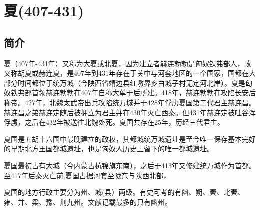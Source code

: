 

\section{夏\tiny(407-431)}

\subsection{简介}

夏（407年-431年）又称为大夏或北夏，因为建立者赫连勃勃是匈奴铁弗部人，故又称胡夏或赫连夏，是407年到431年存在于关中与河套地区的一个国家，国都在大部分时间都位于统万城（今陕西省靖边县红墩界乡白城子村无定河北岸）。夏是匈奴铁弗部首领赫连勃勃在407年自称大单于后所建。418年，赫连勃勃在攻陷长安后称帝。427年，北魏太武帝出兵攻陷统万城并于428年俘虏夏国第二代君主赫连昌。赫连昌之弟赫连定随后被拥立为君主并在430年灭亡西秦。但431年赫连定被吐谷浑俘虏，之后在432年被送往北魏处死。夏国共存在25年，历经三代君主。

夏国是五胡十六国中最晚建立的政权，其都城统万城遗址是至今唯一保存基本完好的早期北方王国都城遗址，也是匈奴人历史上留下的唯一都城遗址。

夏国最初占有大城（今内蒙古杭锦旗东南），之后于413年又修建统万城作为首都。至417年后秦灭亡前,夏国占据河套至陇东与陕西北部，

夏国的地方行政主要分为州、城(县）两级。有史可考的有幽、朔、秦、北秦、雍、并、梁、豫、荆九州。文献记载最多的只有幽州。






